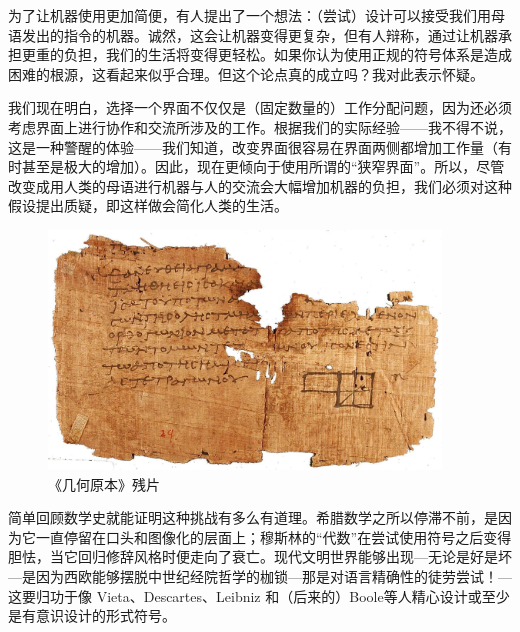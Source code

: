 \documentclass[a4paper,12pt]{article}
\begin{document}
为了让机器使用更加简便，有人提出了一个想法：（尝试）设计可以接受我们用母语发出的指令的机器。诚然，这会让机器变得更复杂，但有人辩称，通过让机器承担更重的负担，我们的生活将变得更轻松。如果你认为使用正规的符号体系是造成困难的根源，这看起来似乎合理。但这个论点真的成立吗？我对此表示怀疑。

我们现在明白，选择一个界面不仅仅是（固定数量的）工作分配问题，因为还必须考虑界面上进行协作和交流所涉及的工作。根据我们的实际经验——我不得不说，这是一种警醒的体验——我们知道，改变界面很容易在界面两侧都增加工作量（有时甚至是极大的增加）。因此，现在更倾向于使用所谓的“狭窄界面”。所以，尽管改变成用人类的母语进行机器与人的交流会大幅增加机器的负担，我们必须对这种假设提出质疑，即这样做会简化人类的生活。

\begin{figure}[ht]
    \centering
    \includegraphics[height=2.5in]{images/elements.jpeg}
    \caption{《几何原本》残片}
\end{figure}

简单回顾数学史就能证明这种挑战有多么有道理。希腊数学之所以停滞不前，是因为它一直停留在口头和图像化的层面上；穆斯林的“代数”在尝试使用符号之后变得胆怯，当它回归修辞风格时便走向了衰亡。现代文明世界能够出现—无论是好是坏—是因为西欧能够摆脱中世纪经院哲学的枷锁—那是对语言精确性的徒劳尝试！—这要归功于像 Vieta、Descartes、Leibniz 和（后来的）Boole等人精心设计或至少是有意识设计的形式符号。
\end{document}
